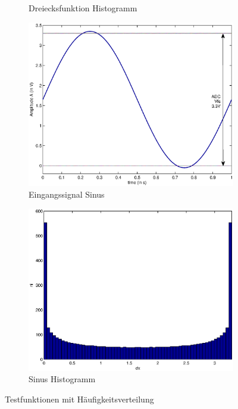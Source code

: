\documentclass[TGAI_Laborbericht.tex]{subfiles}
\begin{document}
\begin{figure}[H]
\begin{subfigure}{.499\textwidth}
		\caption{Dreiecksfunktion Histogramm}
		\label{fig:GRUNDL_RAMP_HIST_2X2}
	\end{subfigure}
	\begin{subfigure}{.499\textwidth}
		\centering\small
		\includegraphics[width=\textwidth]{media/matlab/HISTOGRAM/sin_fkt_samples_5000.eps}
		\caption{Eingangssignal Sinus}
		\label{fig:GRUNDL_SIN_SIN_2X2}
	\end{subfigure}%
	\begin{subfigure}{.499\textwidth}
		\centering\small
		\includegraphics[width=\textwidth]{media/matlab/HISTOGRAM/sin_hist_samples_5000.eps}
		\caption{Sinus Histogramm}
		\label{fig:GRUNDL_SIN_HIST_2X2}	
	\end{subfigure}
\caption{Testfunktionen mit Häufigkeitsverteilung}
\label{fig:GRUNDL_RAMP_SIN_HIST_2X2}
\end{figure}
\end{document}
